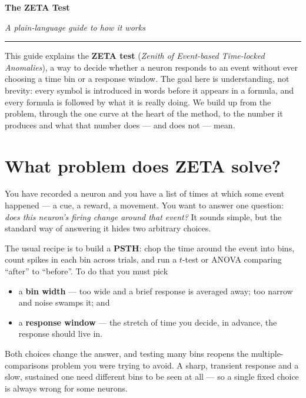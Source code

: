 \documentclass[11pt]{article}
\begin{document}
\thispagestyle{empty}

\begin{center}
  {\Huge\bfseries The ZETA Test\par}
  \vspace{4pt}
  {\large\itshape A plain-language guide to how it works\par}
  \vspace{10pt}
  \textcolor{deepteal}{\rule{0.45\linewidth}{0.5pt}}
\end{center}
\vspace{6pt}

\noindent
This guide explains the \textbf{ZETA test} (\emph{Zenith of Event-based
Time-locked Anomalies}), a way to decide whether a neuron responds to an event
without ever choosing a time bin or a response window. The goal here is
understanding, not brevity: every symbol is introduced in words before it
appears in a formula, and every formula is followed by what it is really doing.
We build up from the problem, through the one curve at the heart of the method,
to the number it produces and what that number does --- and does not --- mean.

\section{What problem does ZETA solve?}

You have recorded a neuron and you have a list of times at which some event
happened --- a cue, a reward, a movement. You want to answer one question:
\emph{does this neuron's firing change around that event?} It sounds simple,
but the standard way of answering it hides two arbitrary choices.

The usual recipe is to build a \textbf{PSTH}: chop the time around the event
into bins, count spikes in each bin across trials, and run a $t$-test or ANOVA
comparing ``after'' to ``before''. To do that you must pick

\begin{itemize}
  \item a \textbf{bin width} --- too wide and a brief response is averaged
        away; too narrow and noise swamps it; and
  \item a \textbf{response window} --- the stretch of time you decide, in
        advance, the response should live in.
\end{itemize}

Both choices change the answer, and testing many bins reopens the
multiple-comparisons problem you were trying to avoid. A sharp, transient
response and a slow, sustained one need different bins to be seen at all --- so
a single fixed choice is always wrong for some neurons.
\end{document}
